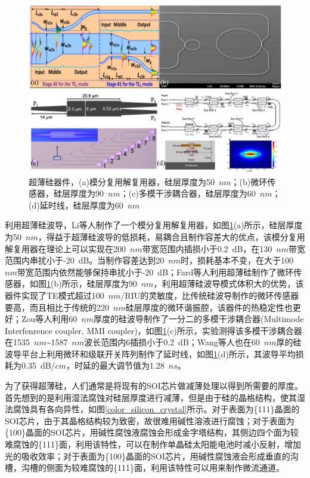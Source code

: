 \begin{figure}[htb]
	\centering
	\includegraphics[width=14cm]{./Pictures/color_thin_application.jpg}
	\captionsetup{justification=centering}
	\caption{超薄硅器件，(a)模分复用解复用器，硅层厚度为50~$nm$\cite{li2017low}；(b)微环传感器，硅层厚度为90~$nm$\cite{fard2014performance}；(c)多模干涉耦合器，硅层厚度为60~$nm$\cite{zou201560}；(d)延时线，硅层厚度为60~$nm$\cite{wang2017continuously}}
	\label{color_thin_application}
\end{figure}

利用超薄硅波导，Li等人制作了一个模分复用解复用器\cite{li2017low}，如图\ref{color_thin_application}(a)所示，硅层厚度为50~$nm$，得益于超薄硅波导的低损耗，易耦合且制作容差大的优点，该模分复用解复用器在理论上可以实现在200~$nm$带宽范围内插损小于0.2~dB，在130~$nm$带宽范围内串扰小于-20~dB。当制作容差达到20~$nm$时，损耗基本不变，在大于100~$nm$带宽范围内依然能够保持串扰小于-20~dB；Fard等人利用超薄硅制作了微环传感器\cite{fard2014performance}，如图\ref{color_thin_application}(b)所示，硅层厚度为90~$nm$，利用超薄硅波导模式体积大的优势，该器件实现了TE模式超过100~$nm$/RIU的灵敏度，比传统硅波导制作的微环传感器要高，而且相比于传统的220~$nm$硅层厚度的微环谐振腔，该器件的热稳定性也更好；Zou等人利用60~$nm$厚度的硅波导制作了一分二的多模干涉耦合器(Multimode Interfenrence coupler, MMI coupler)\cite{zou201560}，如图\ref{color_thin_application}(c)所示，实验测得该多模干涉耦合器在1535~$nm$\~{}1587~$nm$波长范围内6插损小于0.2~dB；Wang等人也在60~$nm$厚的硅波导平台上利用微环和级联开关阵列制作了延时线\cite{wang2017continuously}，如图\ref{color_thin_application}(d)所示，其波导平均损耗为0.35~dB/$cm$，时延的最大调节值为1.28~$ns$。

为了获得超薄硅，人们通常是将现有的SOI芯片做减薄处理以得到所需要的厚度。首先想到的是利用湿法腐蚀对硅层厚度进行减薄，但是由于硅的晶格结构，使其湿法腐蚀具有各向异性，如图\ref{color_silicon_crystal}所示。对于表面为\{111\}晶面的SOI芯片，由于其晶格结构较为致密，故很难用碱性溶液进行腐蚀；对于表面为\{100\}晶面的SOI芯片，用碱性腐蚀液腐蚀会形成金字塔结构，其侧边四个面为较难腐蚀的\{111\}面，利用该特性，可以在制作单晶硅太阳能电池时减小反射，增加光的吸收效率；对于表面为\{100\}晶面的SOI芯片，用碱性腐蚀液会形成垂直的沟槽，沟槽的侧面为较难腐蚀的\{111\}面，利用该特性可以用来制作微流通道。

